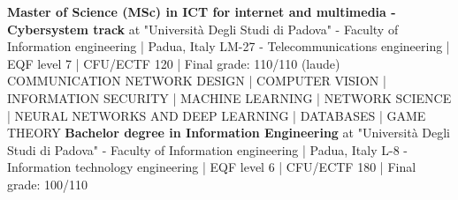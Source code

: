 %
%
%


\begin{scholarship}
					{\textbf{Master of Science (MSc) in ICT for internet and multimedia - Cybersystem track}}
	\scholarshipentry{}
	                {at "Università Degli Studi di Padova" - Faculty of Information engineering | Padua, Italy}
	\scholarshipentry{}
	                {LM-27 - Telecommunications engineering | EQF level 7 | CFU/ECTF 120 | Final grade: 110/110 (laude)}
	\scholarshipentry{}
					{COMMUNICATION NETWORK DESIGN | COMPUTER VISION | INFORMATION SECURITY | MACHINE LEARNING | NETWORK SCIENCE | NEURAL NETWORKS AND DEEP LEARNING | DATABASES | GAME THEORY
	                }
					{\textbf{Bachelor degree in Information Engineering} }
	\scholarshipentry{}
	                {at "Università Degli Studi di Padova" - Faculty of Information engineering | Padua, Italy}
	\scholarshipentry{}
	                {L-8 - Information technology engineering | EQF level 6 | CFU/ECTF 180 | Final grade: 100/110}
	\scholarshipentry{}

\end{scholarship}
